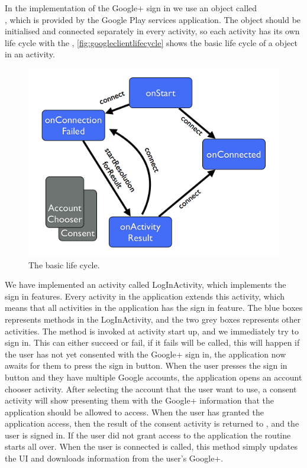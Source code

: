 In the implementation of the Google+ sign in we use an object called \\\citep{googleapiclient-docs}, which is provided by the Google Play services application. 
The object  should be initialised and connected separately in every activity, so each activity has its own life cycle with the , \autoref{fig:googleclientlifecycle} shows the basic life cycle of a  object in an activity.
\begin{figure}[H]
\centering
\includegraphics[width=0.75\linewidth]{img/googleclientflow.png}
\caption{The  basic life cycle.\cite{googleapiclient-lifecycle}}
\label{fig:googleclientlifecycle}
\end{figure}
We have implemented an activity called LogInActivity, which implements the sign in features. Every activity in the application extends this activity, which means that all activities in the application has the sign in feature. 
The blue boxes represents methods in the LogInActivity, and the two grey boxes represents other activities. The method  is invoked at activity start up, and we immediately try to sign in. 
This can either succeed or fail, if it fails  will be called, this will happen if the user has not yet consented with the Google+ sign in, the application now awaits for them to press the sign in button. 
When the user presses the sign in button and they have multiple Google accounts, the application opens an account chooser activity.
After selecting the account that the user want to use, a consent activity will show presenting them with the Google+ information that the application should be allowed to access. 
When the user has granted the application access, then the result of the consent activity is returned to , and the user is signed in. 
If the user did not grant access to the application the routine starts all over. When the user is connected  is called, this method simply updates the UI and downloads information from the user's Google+.

